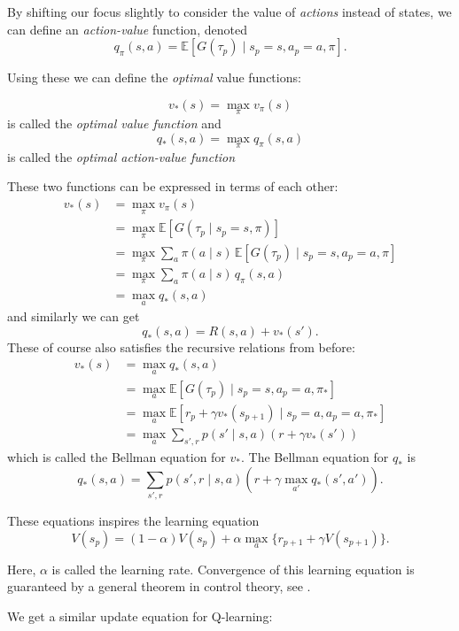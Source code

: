 \documentclass{article}
\theoremstyle{changedot}
\theoremstyle{changedotbreak}
\theoremstyle{nonumberplain}
\newcommand{\m}{\mathbb}
\begin{document}
By shifting our focus slightly to consider the value of \emph{actions} instead of states, we can define an \emph{action-value} function, denoted \[q_{\pi}(s, a) = \m E[G(\tau_{p}) \mid s_{p} = s, a_{p} = a, \pi]. \]

Using these we can define the \emph{optimal} value functions:

\begin{definition}
  \[v_{*}(s) = \max_{\pi} v_{\pi}(s)\] is called the \emph{optimal value function} and \[q_{*}(s, a) = \max_{\pi} q_{\pi}(s, a)\] is called the \emph{optimal action-value function}
\end{definition}

These two functions can be expressed in terms of each other:
\begin{align*}
  v_{*}(s) &= \max_{\pi} v_{\pi}(s) \\
           &= \max_{\pi} \m E[G(\tau_{p} \mid s_{p} = s, \pi)] \\
           &= \max_{\pi} \sum_{a} \pi(a \mid s) \, \m E[G(\tau_{p}) \mid s_{p} = s, a_{p} = a, \pi] \\
           &= \max_{\pi} \sum_{a} \pi(a \mid s) \, q_{\pi} (s, a) \\
  &= \max_{a} q_{*}(s, a)
\end{align*}
and similarly we can get \[q_{*}(s, a) = R(s, a) + v_{*}(s').\] These of course also satisfies the recursive relations from before:
\begin{align*}
  v_{*}(s) &= \max_{a} q_{*}(s, a) \\
           &= \max_{a} \m E[G(\tau_{p}) \mid s_{p} = s, a_{p} = a, \pi_{*}] \\
           &= \max_{a} \m E[r_{p} + \gamma v_{*}(s_{p+1}) \mid s_{p} = a, a_{p} = a, \pi_{*}] \\
           &= \max_{a} \sum_{s', r} p(s' \mid s, a) (r + \gamma v_{*}(s') )
\end{align*}
which is called the Bellman equation for $v_{*}$. The Bellman equation for $q_{*}$ is
\[q_{*}(s, a) = \sum_{s', r} p(s', r \mid s, a) (r + \gamma \max_{a'} q_{*}(s', a')).\]

These equations inspires the learning equation
\[V(s_{p}) = (1 - \alpha) V(s_{p}) + \alpha \max_{a} \{r_{p+1} + \gamma V(s_{p+1})\}.\]

Here, $\alpha$ is called the learning rate. Convergence of this learning equation is guaranteed by a general theorem in control theory, see \cite{cjch}.

We get a similar update equation for Q-learning:
\end{document}
